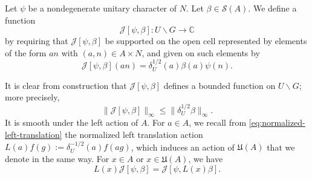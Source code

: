 \begin{definition}
  Let $\psi$ be a nondegenerate unitary character of $N$.  Let $\beta \in \mathcal{S}(A)$.  We define a function 
  \begin{equation*}
    \mathcal{J}[\psi,\beta] : U \backslash G \rightarrow \mathbb{C}
  \end{equation*}
  by requiring that $\mathcal{J}[\psi,\beta]$ be supported on the open cell represented by elements of the form $a n$ with $(a,n) \in A \times N$, and given on such elements by
  \begin{equation*}
    \mathcal{J}[\psi,\beta](a n) = \delta_U^{1/2}(a) \beta(a) \psi(n).
  \end{equation*}
\end{definition}
It is clear from construction that $\mathcal{J}[\psi,\beta]$ defines a bounded function on $U \backslash G$; more precisely,
\begin{equation}\label{eq:mathc-beta_-leq}
  \|\mathcal{J}[\psi,\beta]\|_{\infty} \leq \|\delta_U^{1/2} \beta \|_{\infty}.
\end{equation}
It is smooth under the left action of $A$.  For $a \in A$, we recall from \eqref{eq:normalized-left-translation} the normalized left translation action $L(a) f(g) := \delta_U^{-1/2}(a) f(a g)$, which induces an action of $\mathfrak{U}(A)$ that we denote in the same way.  For $x \in A$ or $x \in \mathfrak{U}(A)$, we have
\begin{equation}\label{eq:lx-mathcalj_psi-beta}
  L(x) \mathcal{J}[\psi,\beta] = \mathcal{J}[\psi,L(x) \beta].
\end{equation}

